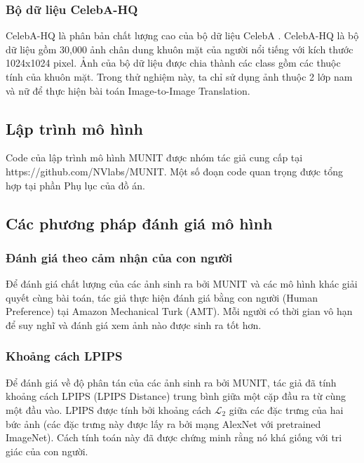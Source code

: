 {    \subsubsection{Bộ dữ liệu CelebA-HQ}
    CelebA-HQ là phân bản chất lượng cao của bộ dữ liệu CelebA \cite{celeba}. CelebA-HQ là bộ dữ liệu gồm 30,000 ảnh chân dung khuôn mặt của người nổi tiếng với kích thước 1024x1024 pixel. Ảnh của bộ dữ liệu được chia thành các class gồm các thuộc tính của khuôn mặt. Trong thử nghiệm này, ta chỉ sử dụng ảnh thuộc 2 lớp nam và nữ để thực hiện bài toán Image-to-Image Translation.
    
    \subsection{Lập trình mô hình}
    Code của lập trình mô hình MUNIT được nhóm tác giả cung cấp tại \\ https://github.com/NVlabs/MUNIT. Một số đoạn code quan trọng được tổng hợp tại phần Phụ lục của đồ án.
    
    \subsection{Các phương pháp đánh giá mô hình}
    \subsubsection{Đánh giá theo cảm nhận của con người}
    Để đánh giá chất lượng của các ảnh sinh ra bởi MUNIT và các mô hình khác giải quyết cùng bài toán, tác giả thực hiện đánh giá bằng con người (Human Preference) tại Amazon Mechanical Turk (AMT). Mỗi người có thời gian vô hạn để suy nghĩ và đánh giá xem ảnh nào được sinh ra tốt hơn.

    \subsubsection{Khoảng cách LPIPS}
    Để đánh giá về độ phân tán của các ảnh sinh ra bởi MUNIT, tác giả đã tính khoảng cách LPIPS (LPIPS Distance) trung bình giữa một cặp đầu ra từ cùng một đầu vào. LPIPS được tính bởi khoảng cách $\mathcal{L}_{2}$ giữa các đặc trưng của hai bức ảnh (các đặc trưng này được lấy ra bởi mạng AlexNet với pretrained ImageNet). Cách tính toán này đã được chứng minh rằng nó khá giống với tri giác của con người.

}
